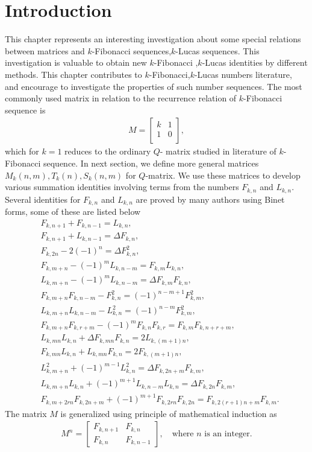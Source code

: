 \section{Introduction}
This chapter represents an interesting investigation about some special relations between matrices and $k$-Fibonacci sequences,$k$-Lucas sequences. This investigation is valuable to obtain new $k$-Fibonacci ,$k$-Lucas identities by different methods. This chapter contributes to $k$-Fibonacci,$k$-Lucas numbers literature, and encourage  to investigate the properties of such number sequences.
The most commonly used matrix in relation to the recurrence relation of $k$-Fibonacci sequence is
\begin{align}
 M = {\left[
          \begin{array}{cc}
            k & 1 \\
            1 & 0 \\
          \end{array}
        \right]},
\end{align}
which for $k=1$ reduces to the ordinary $Q$- matrix studied in literature of $k$-Fibonacci sequence. In next section,  we define more general matrices $M_{k}(n,m), T_{k}(n), S_{k}{(n,m)}$ for $Q$-matrix. We use these matrices to develop various summation identities involving terms from the numbers $F_{k,n}$ and $L_{k,n}$. Several identities for $F_{k,n}$ and $L_{k,n}$ are proved by many authors using Binet forms, some of these are listed below
\begin{align*}
&F_{k,n+1}+F_{k,n-1}= L_{k,n},\\ 
&F_{k,n+1}+L_{k,n-1}= \Delta F_{k,n}, \\
&F_{k,2n}-2(-1)^n= \Delta F_{k,n}^2, \\
&F_{k,m+n}-(-1)^{m}L_{k,n-m}= F_{k,m}L_{k,n}, \\ 
&L_{k,m+n}-(-1)^{m}L_{k,n-m}= \Delta F_{k,m}F_{k,n},\\  
&F_{k,m+n}F_{k,n-m}-F_{k,n}^{2}= (-1)^{n-m+1}F_{k,m}^2,\\  
&L_{k,m+n}L_{k,n-m}-L_{k,n}^{2}= (-1)^{n-m}F_{k,m}^2,\\  
&F_{k,m+n}F_{k,r+m}-(-1)^{m}F_{k,n}F_{k,r}= F_{k,m}F_{k,n+r+m},\\ 
&L_{k,mn}L_{k,n}+\Delta F_{k,mn}F_{k,n}= 2L_{k,(m+1)n},\\
&F_{k,mn}L_{k,n}+L_{k,mn}F_{k,n}= 2F_{k,(m+1)n},\\
&L_{k,m+n}^2+(-1)^{m-1}L_{k,n}^2 = \Delta F_{k,2n+m}F_{k,m},\\
&L_{k,m+n}L_{k,n}+(-1)^{m+1}L_{k,n-m}L_{k,n} = \Delta F_{k,2n}F_{k,m},\\
&F_{k,m+2rn}F_{k,2n+m}+(-1)^{m+1}F_{k,2rn}F_{k,2n} = F_{k,2(r+1)n+m}F_{k,m}.
\end{align*}
The matrix $M$ is generalized using principle of mathematical induction as 
\begin{align*}
 M^n = {
          \begin{bmatrix}
            F_{k,n+1} & F_{k,n} \\
                       F_{k,n} & F_{k,n-1}
          \end{bmatrix}
       },\quad\text{where $n$ is an integer.}
\end{align*}
